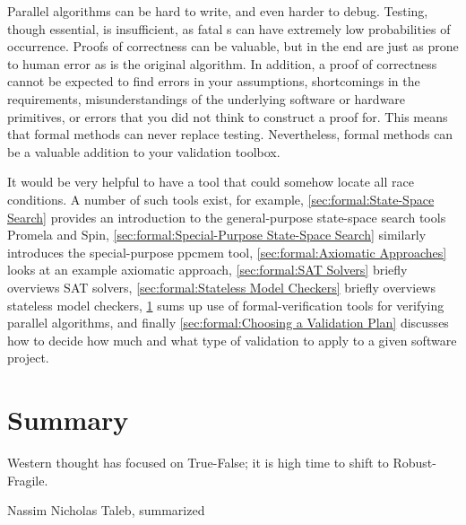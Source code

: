 
%


Parallel algorithms can be hard to write, and even harder to debug.
Testing, though essential, is insufficient, as fatal s
can have extremely low probabilities of occurrence.
Proofs of correctness can be valuable, but in the end are just as
prone to human error as is the original algorithm.
In addition, a proof of correctness cannot be expected to find errors
in your assumptions, shortcomings in the requirements,
misunderstandings of the underlying software or hardware primitives,
or errors that you did not think to construct a proof for.
This means that formal methods can never replace testing.
Nevertheless, formal methods can be a valuable addition to your validation
toolbox.

It would be very helpful to have a tool that could somehow locate
all race conditions.
A number of such tools exist, for example,
\cref{sec:formal:State-Space Search} provides an
introduction to the general-purpose state-space search tools Promela and Spin,
\cref{sec:formal:Special-Purpose State-Space Search}
similarly introduces the special-purpose ppcmem tool,
\cref{sec:formal:Axiomatic Approaches}
looks at an example axiomatic approach,
\cref{sec:formal:SAT Solvers}
briefly overviews SAT solvers,
\cref{sec:formal:Stateless Model Checkers}
briefly overviews stateless model checkers,
\cref{sec:formal:Summary}
sums up use of formal-verification tools for verifying parallel algorithms,
and finally
\cref{sec:formal:Choosing a Validation Plan}
discusses how to decide how much and what type of validation to apply
to a given software project.








\section{Summary}
\label{sec:formal:Summary}
%
\epigraph{Western thought has focused on True-False;
	  it is high time to shift to Robust-Fragile.}
	 {Nassim Nicholas Taleb, summarized}

